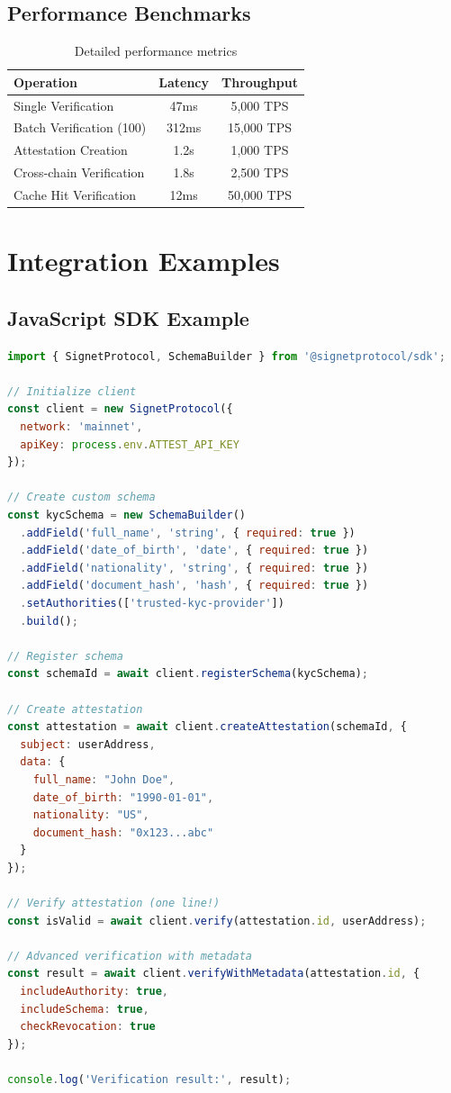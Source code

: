 \documentclass[11pt,a4paper]{article}
\begin{document}
\subsection{Performance Benchmarks}

\begin{table}[H]
\centering
\caption{Detailed performance metrics}
\begin{tabular}{@{}lcc@{}}
\toprule
\textbf{Operation} & \textbf{Latency} & \textbf{Throughput} \\
\midrule
Single Verification & 47ms & 5,000 TPS \\
Batch Verification (100) & 312ms & 15,000 TPS \\
Attestation Creation & 1.2s & 1,000 TPS \\
Cross-chain Verification & 1.8s & 2,500 TPS \\
Cache Hit Verification & 12ms & 50,000 TPS \\
\bottomrule
\end{tabular}
\end{table}

\section{Integration Examples}\label{app:integration}

\subsection{JavaScript SDK Example}

\begin{lstlisting}[language=JavaScript, caption={Complete JavaScript integration example}]
import { SignetProtocol, SchemaBuilder } from '@signetprotocol/sdk';

// Initialize client
const client = new SignetProtocol({
  network: 'mainnet',
  apiKey: process.env.ATTEST_API_KEY
});

// Create custom schema
const kycSchema = new SchemaBuilder()
  .addField('full_name', 'string', { required: true })
  .addField('date_of_birth', 'date', { required: true })
  .addField('nationality', 'string', { required: true })
  .addField('document_hash', 'hash', { required: true })
  .setAuthorities(['trusted-kyc-provider'])
  .build();

// Register schema
const schemaId = await client.registerSchema(kycSchema);

// Create attestation
const attestation = await client.createAttestation(schemaId, {
  subject: userAddress,
  data: {
    full_name: "John Doe",
    date_of_birth: "1990-01-01",
    nationality: "US",
    document_hash: "0x123...abc"
  }
});

// Verify attestation (one line!)
const isValid = await client.verify(attestation.id, userAddress);

// Advanced verification with metadata
const result = await client.verifyWithMetadata(attestation.id, {
  includeAuthority: true,
  includeSchema: true,
  checkRevocation: true
});

console.log('Verification result:', result);
\end{lstlisting}
\end{document}
